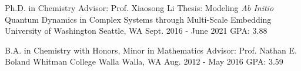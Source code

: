 


\begin{cventries}


\cventry
{Ph.D. in Chemistry \newline
Advisor: Prof. Xiaosong Li \newline
Thesis: Modeling \textit{Ab Initio} Quantum Dynamics in Complex Systems through Multi-Scale Embedding}%
{University of Washington} %
{Seattle, WA\vspace{-0.5cm}} %
{Sept. 2016 - June 2021} %
{GPA: 3.88} %



\cventry
{B.A. in Chemistry with Honors, Minor in Mathematics \newline
Advisor: Prof. Nathan E. Boland}%
{Whitman College} %
{Walla Walla, WA} %
{Aug. 2012 - May 2016} %
{GPA: 3.59} %


\end{cventries}
